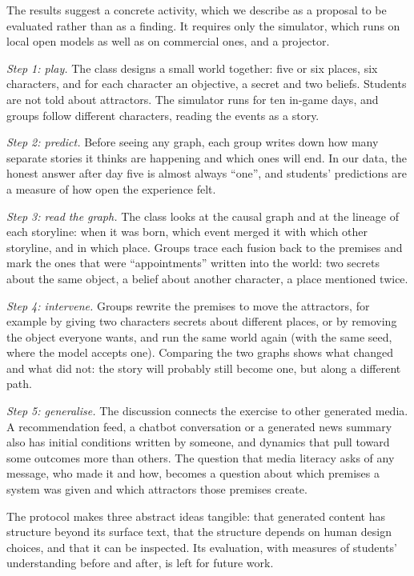 \documentclass[12pt]{article}
\begin{document}
The results suggest a concrete activity, which we describe as a proposal to
be evaluated rather than as a finding. It requires only the simulator, which
runs on local open models as well as on commercial ones, and a projector.

\emph{Step 1: play.} The class designs a small world together: five or six
places, six characters, and for each character an objective, a secret and
two beliefs. Students are not told about attractors. The simulator runs for
ten in-game days, and groups follow different characters, reading the
events as a story.

\emph{Step 2: predict.} Before seeing any graph, each group writes down how
many separate stories it thinks are happening and which ones will end. In
our data, the honest answer after day five is almost always \enquote{one},
and students' predictions are a measure of how open the experience felt.

\emph{Step 3: read the graph.} The class looks at the causal graph and at
the lineage of each storyline: when it was born, which event merged it with
which other storyline, and in which place. Groups trace each fusion back to
the premises and mark the ones that were \enquote{appointments} written
into the world: two secrets about the same object, a belief about another
character, a place mentioned twice.

\emph{Step 4: intervene.} Groups rewrite the premises to move the attractors,
for example by giving two characters secrets about different places, or by
removing the object everyone wants, and run the same world again (with the
same seed, where the model accepts one). Comparing the two graphs shows what changed and what did not:
the story will probably still become one, but along a different path.

\emph{Step 5: generalise.} The discussion connects the exercise to other
generated media. A recommendation feed, a chatbot conversation or a
generated news summary also has initial conditions written by someone, and
dynamics that pull toward some outcomes more than others. The question that
media literacy asks of any message, who made it and how, becomes a question
about which premises a system was given and which attractors those
premises create.

The protocol makes three abstract ideas tangible: that generated content has
structure beyond its surface text, that the structure depends on human
design choices, and that it can be inspected. Its evaluation, with measures
of students' understanding before and after, is left for future work.
\end{document}
